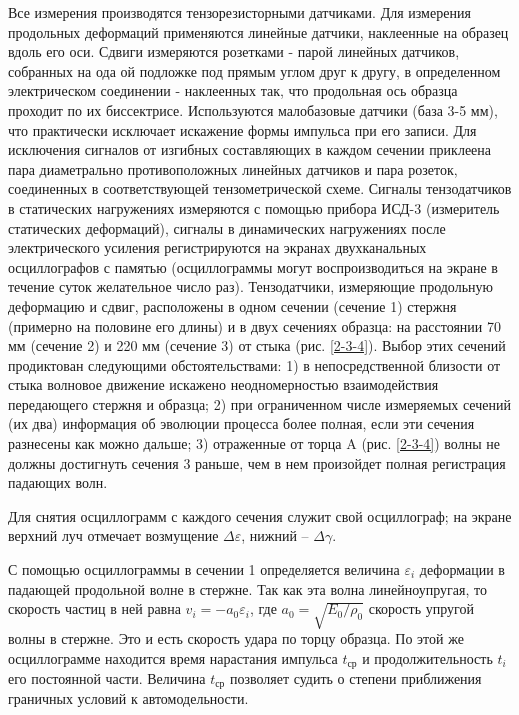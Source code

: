 \documentclass[specialist, subf, href, colorlinks=true, 14pt, final]{disser}
\theoremstyle{definition}
\begin{document}
Все измерения производятся тензорезисторными датчиками. Для
измерения продольных деформаций применяются линейные датчики, 
наклеенные на образец вдоль его оси. Сдвиги измеряются розетками -
парой линейных датчиков, собранных на ода ой подложке под прямым
углом друг к другу, в определенном электрическом соединении - 
наклеенных так, что продольная ось образца проходит по их 
биссектрисе. Используются малобазовые датчики (база 3-5 мм), что 
практически исключает искажение формы импульса при его записи. Для
исключения сигналов от изгибных составляющих в каждом сечении
приклеена пара диаметрально противоположных линейных датчиков и
пара розеток, соединенных в соответствующей тензометрической 
схеме. Сигналы тензодатчиков в статических нагружениях измеряются
с помощью прибора ИСД-3 (измеритель статических деформаций), 
сигналы в динамических нагружениях после электрического усиления
регистрируются на экранах двухканальных осциллографов с памятью
(осциллограммы могут воспроизводиться на экране в течение суток
желательное число раз). Тензодатчики, измеряющие продольную 
деформацию и сдвиг, расположены в одном сечении (сечение 1) 
стержня (примерно на половине его длины) и в двух сечениях образца:
на расстоянии 70 мм (сечение 2) и 220 мм (сечение 3) от стыка
(рис. \ref{2-3-4}). Выбор этих сечений продиктован следующими 
обстоятельствами: 1) в непосредственной близости от стыка волновое движение искажено неодномерностью взаимодействия передающего стержня и
образца; 2) при ограниченном числе измеряемых сечений (их два)
информация об эволюции процесса более полная, если эти сечения
разнесены как можно дальше; 3) отраженные от торца A (рис. \ref{2-3-4}) волны не должны достигнуть сечения 3 раньше, чем в нем 
произойдет полная регистрация падающих волн.

Для снятия осциллограмм с каждого сечения служит свой осциллограф; на экране верхний луч отмечает возмущение $\Delta \varepsilon$, нижний -- $\Delta\gamma$.

С помощью осциллограммы в сечении 1 определяется величина $\varepsilon_i$ деформации в падающей продольной волне в стержне. Так как эта волна линейноупругая, то скорость частиц в ней равна $v_{i} = -a_{0}\varepsilon_i$, где $a_{0} = \sqrt{E_{0}/\rho_0}$ скорость упругой волны в стержне. Это и есть скорость удара по торцу образца. По этой же осциллограмме находится время нарастания импульса $t_{\text{ср}}$ и продолжительность $t_i$ его постоянной части. Величина $t_{\text{ср}}$ позволяет судить о степени приближения граничных условий к автомодельности.
\end{document}
